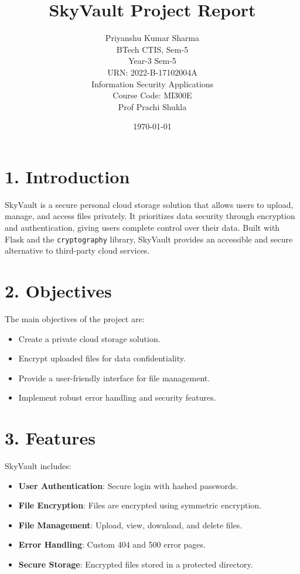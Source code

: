 \documentclass[12pt,a4paper]{article}
\title{\textbf{SkyVault Project Report}}
\author{Priyanshu Kumar Sharma\\ BTech CTIS, Sem-5\\ Year-3   Sem-5\\  URN: 2022-B-17102004A\\ Information Security Applications\\ Course Code: MI300E\\ Prof Prachi Shukla}
\date{\today}
\begin{document}


\maketitle

\section*{1. Introduction}
SkyVault is a secure personal cloud storage solution that allows users to upload, manage, and access files privately. It prioritizes data security through encryption and authentication, giving users complete control over their data. Built with Flask and the \texttt{cryptography} library, SkyVault provides an accessible and secure alternative to third-party cloud services.

\section*{2. Objectives}
The main objectives of the project are:
\begin{itemize}
    \item Create a private cloud storage solution.
    \item Encrypt uploaded files for data confidentiality.
    \item Provide a user-friendly interface for file management.
    \item Implement robust error handling and security features.
\end{itemize}

\section*{3. Features}
SkyVault includes:
\begin{itemize}
    \item \textbf{User Authentication}: Secure login with hashed passwords.
    \item \textbf{File Encryption}: Files are encrypted using symmetric encryption.
    \item \textbf{File Management}: Upload, view, download, and delete files.
    \item \textbf{Error Handling}: Custom 404 and 500 error pages.
    \item \textbf{Secure Storage}: Encrypted files stored in a protected directory.
\end{itemize}
\end{document}
